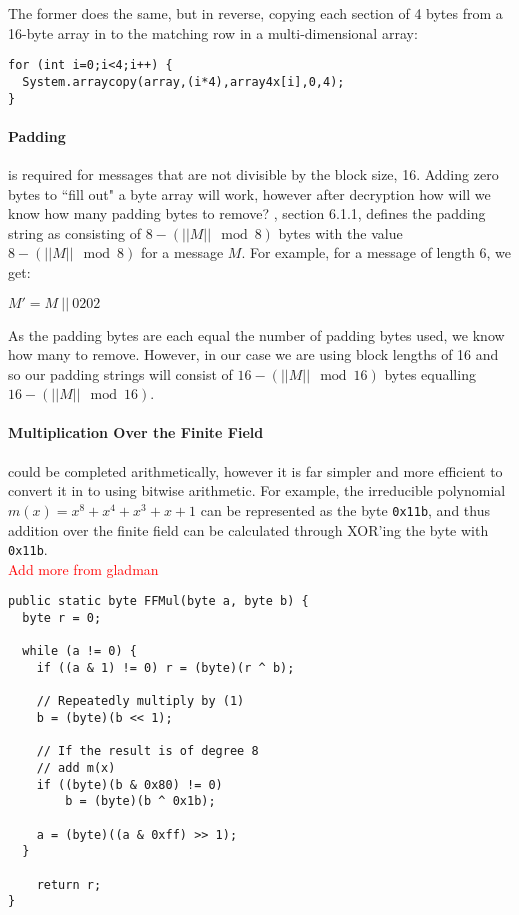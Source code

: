     The former does the same, but in reverse, copying each section of 4 bytes from a 16-byte array in to the matching row in a multi-dimensional array: \\
    
    \begin{lstlisting}
for (int i=0;i<4;i++) {
  System.arraycopy(array,(i*4),array4x[i],0,4);
}
\end{lstlisting}
    
    \paragraph{Padding} is required for messages that are not divisible by the block size, 16. Adding zero bytes to ``fill out" a byte array will work, however after decryption how will we know how many padding bytes to remove? \cite{Kaliski:2000aa}, section 6.1.1, defines the padding string as consisting of $8-(||M|| \mod 8)$ bytes with the value $8-(||M|| \mod 8)$ for a message $M$. For example, for a message of length 6, we get:
    
    \begin{center}
      $M' = M \ || \ 0202$
    \end{center}
    
    As the padding bytes are each equal the number of padding bytes used, we know how many to remove. However, in our case we are using block lengths of 16 and so our padding strings will consist of $16-(||M|| \mod 16)$ bytes equalling $16-(||M|| \mod 16)$.
    
    \paragraph{Multiplication Over the Finite Field} could be completed arithmetically, however it is far simpler and more efficient to convert it in to using bitwise arithmetic. For example, the irreducible polynomial $m(x) = x^8 + x^4 + x^3 + x + 1$ can be represented as the byte \verb!0x11b!, and thus addition over the finite field can be calculated through XOR'ing the byte with \verb!0x11b!. \\
    
    \textcolor{red}{Add more from gladman}
    
    \begin{lstlisting}
public static byte FFMul(byte a, byte b) {
  byte r = 0;
  
  while (a != 0) {
    if ((a & 1) != 0) r = (byte)(r ^ b);
    
    // Repeatedly multiply by (1)
    b = (byte)(b << 1);
    
    // If the result is of degree 8
    // add m(x)
    if ((byte)(b & 0x80) != 0)
        b = (byte)(b ^ 0x1b);
    
    a = (byte)((a & 0xff) >> 1);
  }
      
    return r;
}
\end{lstlisting}
  
